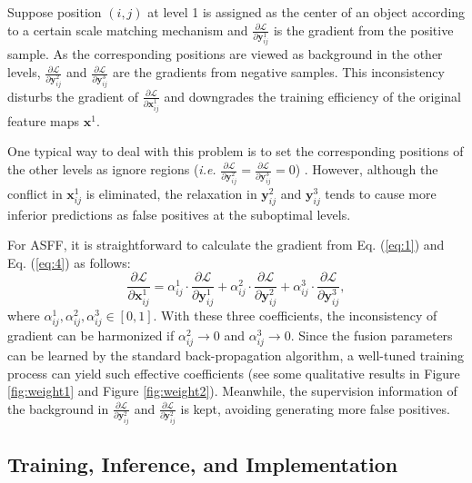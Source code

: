 \documentclass[10pt,twocolumn,letterpaper]{article}
\begin{document}
Suppose position $(i,j)$ at level 1 is assigned as the center of an object according to a certain scale matching mechanism and $\frac{\partial \mathcal{L}}{\partial \mathbf{y}_{ij}^1}$ is the gradient from  the positive sample. As the corresponding positions are viewed as background in the other levels, $\frac{\partial \mathcal{L}}{\partial \mathbf{y}_{ij}^2}$ and $\frac{\partial \mathcal{L}}{\partial \mathbf{y}_{ij}^3}$ are the gradients from negative samples. This inconsistency disturbs the gradient of $\frac{\partial \mathcal{L}}{\partial \mathbf{x}_{ij}^1}$ and downgrades the training efficiency of the original feature maps $\mathbf{x}^1$. 

One typical way to deal with this problem is to set the corresponding positions of the other levels as ignore regions (\emph{i.e.} $\frac{\partial \mathcal{L}}{\partial \mathbf{y}_{ij}^2}=\frac{\partial \mathcal{L}}{\partial \mathbf{y}_{ij}^3}=0$) \cite{guide,FSAF}. However, although the conflict in $\mathbf{x}_{ij}^1$ is eliminated, the relaxation in $\mathbf{y}_{ij}^2$ and $\mathbf{y}_{ij}^3$ tends to cause more inferior predictions as false positives at the suboptimal levels. 

For ASFF, it is straightforward to calculate the gradient from Eq. (\ref{eq:1}) and Eq. (\ref{eq:4}) as follows:
\begin{equation}
\label{eq:6}
\frac{\partial \mathcal{L}}{\partial \mathbf{x}_{ij}^1} =
\alpha_{ij}^1 \cdot 
\frac{\partial \mathcal{L}}{\partial \mathbf{y}_{ij}^1}        + 
\alpha_{ij}^2  \cdot 
\frac{\partial \mathcal{L}}{\partial \mathbf{y}_{ij}^2}        +
\alpha_{ij}^3  \cdot 
\frac{\partial \mathcal{L}}{\partial \mathbf{y}_{ij}^3},
\end{equation}
where $\alpha^1_{ij},\alpha^2_{ij},\alpha^3_{ij} \in [0,1]$. With these three coefficients, the inconsistency of gradient can be harmonized if $\alpha^2_{ij} \rightarrow 0$ and $\alpha^3_{ij} \rightarrow 0$. Since the fusion parameters can be learned by the standard back-propagation algorithm, a well-tuned training process can yield such effective coefficients (see some qualitative results in Figure \ref{fig:weight1} and Figure \ref{fig:weight2}). Meanwhile, the supervision information of the background in $\frac{\partial \mathcal{L}}{\partial \mathbf{y}_{ij}^2}$ and $\frac{\partial \mathcal{L}}{\partial \mathbf{y}_{ij}^2}$ is kept, avoiding generating more false positives.   

\subsection{Training, Inference, and Implementation}
\end{document}
